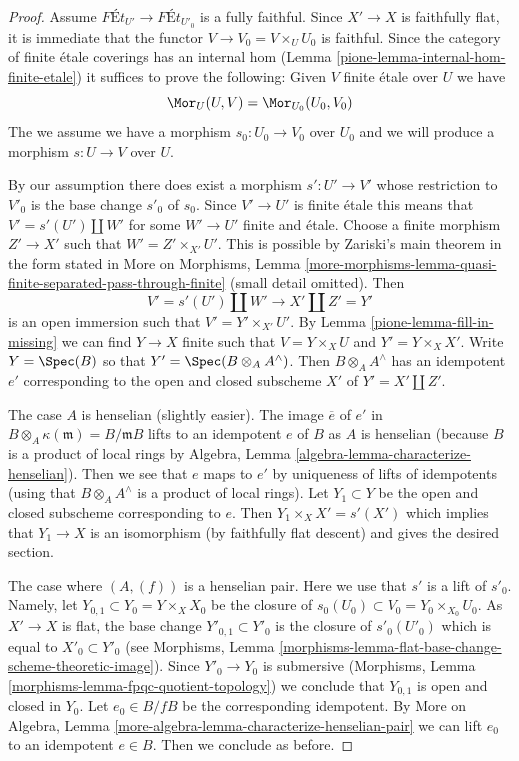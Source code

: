 \begin{proof}

Assume $\textit{F\'Et}_{U'} \longrightarrow \textit{F\'Et}_{U'_0}$
is a fully faithful. Since $X' \to X$ is faithfully flat, it is
immediate that the functor $V \to V_0 = V \times_U U_0$ is faithful.
Since the category of finite \'etale coverings has an internal hom
(Lemma \ref{pione-lemma-internal-hom-finite-etale})
it suffices to prove the following: Given $V$ finite \'etale over $U$
we have
$$
\Mor_U(U, V) = \Mor_{U_0}(U_0, V_0)
$$
The we assume we have a morphism $s_0 : U_0 \to V_0$ over $U_0$ and we will
produce a morphism $s : U \to V$ over $U$.

\medskip\noindent
By our assumption there does exist a morphism $s' : U' \to V'$
whose restriction to $V'_0$ is the base change $s'_0$ of $s_0$.
Since $V' \to U'$ is finite \'etale this means that $V' = s'(U') \amalg W'$
for some $W' \to U'$ finite and \'etale.
Choose a finite morphism $Z' \to X'$ such that $W' = Z' \times_{X'} U'$.
This is possible by Zariski's main theorem in the form stated in
More on Morphisms, Lemma
\ref{more-morphisms-lemma-quasi-finite-separated-pass-through-finite}
(small detail omitted).
Then
$$
V' = s'(U') \amalg W' \longrightarrow X' \amalg Z' = Y'
$$
is an open immersion such that $V' = Y' \times_{X'} U'$.
By Lemma \ref{pione-lemma-fill-in-missing} we can find $Y \to X$ finite
such that $V = Y \times_X U$ and $Y' = Y \times_X X'$.
Write $Y = \Spec(B)$ so that $Y' = \Spec(B \otimes_A A^\wedge)$.
Then $B \otimes_A A^\wedge$ has an idempotent $e'$
corresponding to the open and closed subscheme $X'$ of $Y' = X' \amalg Z'$.

\medskip\noindent
The case $A$ is henselian (slightly easier). The image $\overline{e}$
of $e'$ in $B \otimes_A \kappa(\mathfrak m) = B/\mathfrak mB$ lifts to an
idempotent $e$ of $B$ as $A$ is henselian (because $B$ is a product of
local rings by Algebra, Lemma \ref{algebra-lemma-characterize-henselian}).
Then we see that $e$ maps to $e'$ by uniqueness of lifts of idempotents
(using that $B \otimes_A A^\wedge$ is a product of local rings).
Let $Y_1 \subset Y$ be the open and closed subscheme corresponding to $e$.
Then $Y_1 \times_X X' = s'(X')$ which implies that $Y_1 \to X$ is
an isomorphism (by faithfully flat descent) and gives the desired section.

\medskip\noindent
The case where $(A, (f))$ is a henselian pair. Here we use that $s'$ is
a lift of $s'_0$. Namely, let $Y_{0, 1} \subset Y_0 = Y \times_X X_0$
be the closure of $s_0(U_0) \subset V_0 = Y_0 \times_{X_0} U_0$.
As $X' \to X$ is flat, the base change $Y'_{0, 1} \subset Y'_0$
is the closure of $s'_0(U'_0)$ which is equal to $X'_0 \subset Y'_0$
(see Morphisms, Lemma
\ref{morphisms-lemma-flat-base-change-scheme-theoretic-image}).
Since $Y'_0 \to Y_0$ is submersive
(Morphisms, Lemma \ref{morphisms-lemma-fpqc-quotient-topology})
we conclude that $Y_{0, 1}$ is open and closed in $Y_0$.
Let $e_0 \in B/fB$ be the corresponding idempotent.
By More on Algebra, Lemma
\ref{more-algebra-lemma-characterize-henselian-pair}
we can lift $e_0$ to an idempotent $e \in B$.
Then we conclude as before.
\end{proof}

